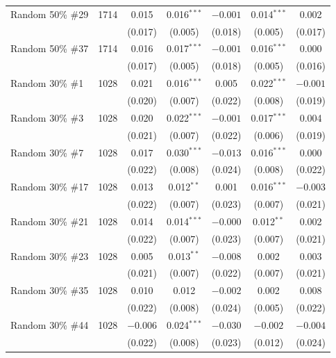 \begin{table}[H]
\begin{tabular}{@{}lc*{5}{c}@{}}
    Random 50\% \#29 & 1714 & 0.015 & 0.016$^{***}$ & $-0.001$ & 0.014$^{***}$ & 0.002 \\
    & & (0.017) & (0.005) & (0.018) & (0.005) & (0.017) \\[0.3em]
    
    Random 50\% \#37 & 1714 & 0.016 & 0.017$^{***}$ & $-0.001$ & 0.016$^{***}$ & 0.000 \\
    & & (0.017) & (0.005) & (0.018) & (0.005) & (0.016) \\[0.3em]
    
    Random 30\% \#1 & 1028 & 0.021 & 0.016$^{***}$ & 0.005 & 0.022$^{***}$ & $-0.001$ \\
    & & (0.020) & (0.007) & (0.022) & (0.008) & (0.019) \\[0.3em]
    
    Random 30\% \#3 & 1028 & 0.020 & 0.022$^{***}$ & $-0.001$ & 0.017$^{***}$ & 0.004 \\
    & & (0.021) & (0.007) & (0.022) & (0.006) & (0.019) \\[0.3em]
    
    Random 30\% \#7 & 1028 & 0.017 & 0.030$^{***}$ & $-0.013$ & 0.016$^{***}$ & 0.000 \\
    & & (0.022) & (0.008) & (0.024) & (0.008) & (0.022) \\[0.3em]
    
    Random 30\% \#17 & 1028 & 0.013 & 0.012$^{**}$ & 0.001 & 0.016$^{***}$ & $-0.003$ \\
    & & (0.022) & (0.007) & (0.023) & (0.007) & (0.021) \\[0.3em]
    
    Random 30\% \#21 & 1028 & 0.014 & 0.014$^{***}$ & $-0.000$ & 0.012$^{**}$ & 0.002 \\
    & & (0.022) & (0.007) & (0.023) & (0.007) & (0.021) \\[0.3em]
    
    Random 30\% \#23 & 1028 & 0.005 & 0.013$^{**}$ & $-0.008$ & 0.002 & 0.003 \\
    & & (0.021) & (0.007) & (0.022) & (0.007) & (0.021) \\[0.3em]
    
    Random 30\% \#35 & 1028 & 0.010 & 0.012 & $-0.002$ & 0.002 & 0.008 \\
    & & (0.022) & (0.008) & (0.024) & (0.005) & (0.022) \\[0.3em]
    
    Random 30\% \#44 & 1028 & $-0.006$ & 0.024$^{***}$ & $-0.030$ & $-0.002$ & $-0.004$ \\
    & & (0.022) & (0.008) & (0.023) & (0.012) & (0.024) \\
    

\end{tabular}
\end{table}
